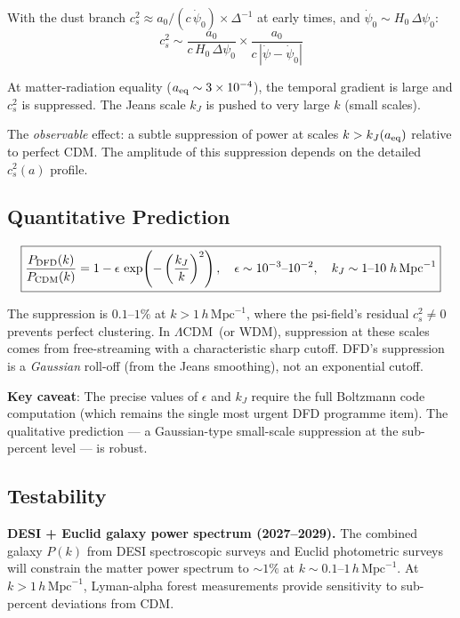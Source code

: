\documentclass[11pt]{article}
\newcommand{\LCDM}{$\Lambda$CDM}
\begin{document}
With the dust branch $c_s^2 \approx a_0/(c\,\dot\psi_0) \times
\Delta^{-1}$ at early times, and $\dot\psi_0 \sim H_0\,\Delta\psi_0$:
\begin{equation}
c_s^2 \sim \frac{a_0}{c\,H_0\,\Delta\psi_0} \times
\frac{a_0}{c\,|\dot\psi - \dot\psi_0|}
\end{equation}

At matter-radiation equality ($a_{\rm eq} \sim 3 \times 10^{-4}$),
the temporal gradient is large and $c_s^2$ is suppressed.  The Jeans
scale $k_J$ is pushed to very large $k$ (small scales).

The \emph{observable} effect: a subtle suppression of power at
scales $k > k_J(a_{\rm eq})$ relative to perfect CDM.  The amplitude
of this suppression depends on the detailed $c_s^2(a)$ profile.

\subsection{Quantitative Prediction}

\begin{equation}
\boxed{
\frac{P_{\rm DFD}(k)}{P_{\rm CDM}(k)} = 1 - \epsilon\,\exp\!\left(
-\left(\frac{k_J}{k}\right)^2\right),
\quad \epsilon \sim 10^{-3}\text{--}10^{-2},
\quad k_J \sim 1\text{--}10\;h\,\text{Mpc}^{-1}
}
\end{equation}

The suppression is $0.1$--$1\%$ at $k > 1\,h\,\text{Mpc}^{-1}$, where
the psi-field's residual $c_s^2 \neq 0$ prevents perfect clustering.
In \LCDM\ (or WDM), suppression at these scales comes from free-streaming
with a characteristic sharp cutoff.  DFD's suppression is a \emph{Gaussian}
roll-off (from the Jeans smoothing), not an exponential cutoff.

\textbf{Key caveat}: The precise values of $\epsilon$ and $k_J$ require
the full Boltzmann code computation (which remains the single most urgent
DFD programme item).  The qualitative prediction --- a Gaussian-type
small-scale suppression at the sub-percent level --- is robust.

\subsection{Testability}

\textbf{DESI + Euclid galaxy power spectrum (2027--2029).}
The combined galaxy $P(k)$ from DESI spectroscopic surveys and Euclid
photometric surveys will constrain the matter power spectrum to $\sim 1\%$
at $k \sim 0.1$--$1\,h\,\text{Mpc}^{-1}$.  At $k > 1\,h\,\text{Mpc}^{-1}$,
Lyman-alpha forest measurements provide sensitivity to sub-percent
deviations from CDM.
\end{document}
